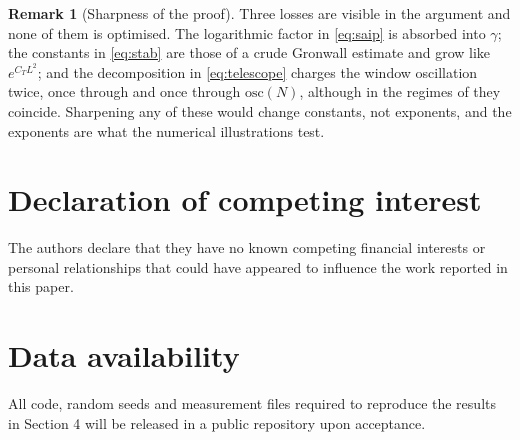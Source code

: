 \documentclass[a4paper,fleqn]{cas-dc}
\theoremstyle{definition}
\newtheorem{remark}[theorem]{Remark}
\begin{document}
\begin{remark}[Sharpness of the proof]
\label{rem:proof-sharp}
Three losses are visible in the argument and none of them is optimised. The
logarithmic factor in \eqref{eq:saip} is absorbed into $\gamma$; the constants in
\eqref{eq:stab} are those of a crude Gronwall estimate and grow like
$e^{C_{T}L^{2}}$; and the decomposition in \eqref{eq:telescope} charges the window
oscillation twice, once through  and once through $\mathrm{osc}(N)$,
although in the regimes of  they coincide. Sharpening any of these
would change constants, not exponents, and the exponents are what the numerical
illustrations test.
\end{remark}

\section*{Declaration of competing interest}
The authors declare that they have no known competing financial interests or personal
relationships that could have appeared to influence the work reported in this paper.

\section*{Data availability}
All code, random seeds and measurement files required to reproduce the results in Section 4 will be released in a public repository upon acceptance.


\end{document}
